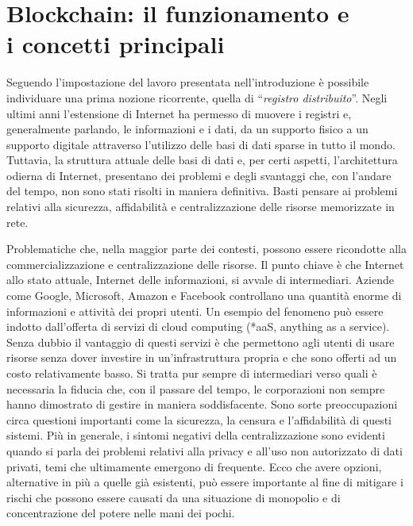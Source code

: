 \chapter{Blockchain: il funzionamento e\\ i concetti principali}
\label{ch:blockchain}

Seguendo l’impostazione del lavoro presentata nell’introduzione è possibile individuare una prima nozione ricorrente, quella di “\emph{registro distribuito}”. Negli ultimi anni l’estensione di Internet ha permesso di muovere i registri e, generalmente parlando, le informazioni e i dati, da un supporto fisico a un supporto digitale attraverso l’utilizzo delle basi di dati sparse in tutto il mondo. Tuttavia, la struttura attuale delle basi di dati e, per certi aspetti, l’architettura odierna di Internet, presentano dei problemi e degli svantaggi che, con l’andare del tempo, non sono stati risolti in maniera definitiva. Basti pensare ai problemi relativi alla sicurezza, affidabilità e centralizzazione delle risorse memorizzate in rete.

Problematiche che, nella maggior parte dei contesti, possono essere ricondotte alla commercializzazione e centralizzazione delle risorse. Il punto chiave è che Internet allo stato attuale, Internet delle informazioni, si avvale di intermediari. Aziende come Google, Microsoft, Amazon e Facebook controllano una quantità enorme di informazioni e attività dei propri utenti. Un esempio del fenomeno può essere indotto dall’offerta di servizi di cloud computing (*aaS, anything as a service). Senza dubbio il vantaggio di questi servizi è che permettono agli utenti di usare risorse senza dover investire in un’infrastruttura propria e che sono offerti ad un costo relativamente basso. Si tratta pur sempre di intermediari verso quali è necessaria la fiducia che, con il passare del tempo, le corporazioni non sempre hanno dimostrato di gestire in maniera soddisfacente. Sono sorte preoccupazioni circa questioni importanti come la sicurezza, la censura e l'affidabilità di questi sistemi. Più in generale, i sintomi negativi della centralizzazione sono evidenti quando si parla dei problemi relativi alla privacy e all'uso non autorizzato di dati privati, temi che ultimamente emergono di frequente. Ecco che avere opzioni, alternative in più a quelle già esistenti, può essere importante al fine di mitigare i rischi che possono essere causati da una situazione di monopolio e di concentrazione del potere nelle mani dei pochi.

